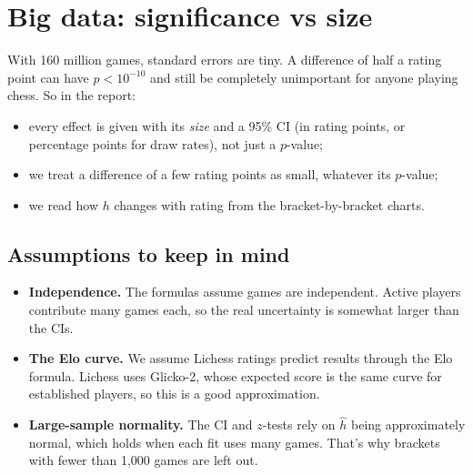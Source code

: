 \documentclass[11pt,a4paper]{article}
\begin{document}
\section{Big data: significance vs size}\label{sec:bign}
With 160 million games, standard errors are tiny. A difference of half a rating point can
have $p < 10^{-10}$ and still be completely unimportant for anyone playing chess. So in the
report:
\begin{itemize}
\item every effect is given with its \emph{size} and a 95\% CI (in rating points, or
  percentage points for draw rates), not just a $p$-value;
\item we treat a difference of a few rating points as small, whatever its $p$-value;
\item we read how $h$ changes with rating from the bracket-by-bracket charts.
\end{itemize}

\subsection*{Assumptions to keep in mind}
\begin{itemize}
\item \textbf{Independence.} The formulas assume games are independent. Active players
  contribute many games each, so the real uncertainty is somewhat larger than the CIs.
\item \textbf{The Elo curve.} We assume Lichess ratings predict results through the Elo
  formula. Lichess uses Glicko-2, whose expected score is the same curve for established
  players, so this is a good approximation.
\item \textbf{Large-sample normality.} The CI and $z$-tests rely on $\hat h$ being
  approximately normal, which holds when each fit uses many games. That's why brackets with
  fewer than 1{,}000 games are left out.
\end{itemize}
\end{document}
